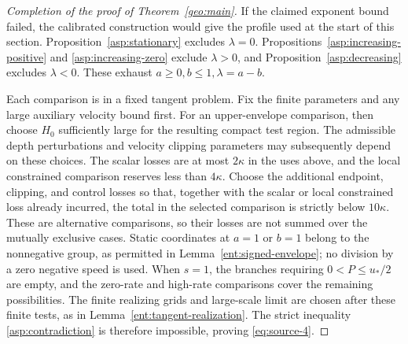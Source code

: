 \begin{proof}[Completion of the proof of Theorem~\ref{geo:main}]
If the claimed exponent bound failed, the calibrated construction would
give the profile used at the start of this section.
Proposition~\ref{asp:stationary} excludes \(\lambda=0\).
Propositions~\ref{asp:increasing-positive} and
\ref{asp:increasing-zero} exclude \(\lambda>0\), and
Proposition~\ref{asp:decreasing} excludes \(\lambda<0\).
These exhaust \(a\ge0,b\le1,\lambda=a-b\).

Each comparison is in a fixed tangent problem. Fix the finite parameters
and any large auxiliary velocity bound first. For an upper-envelope
comparison, then choose \(H_0\) sufficiently large for the resulting
compact test region. The admissible depth perturbations and velocity
clipping parameters may subsequently depend on these choices.
The scalar losses are at most \(2\kappa\) in the uses above,
and the local constrained comparison reserves less than \(4\kappa\).
Choose the additional endpoint, clipping, and control losses so that,
together with the scalar or local constrained loss already incurred,
the total in the selected comparison is strictly below \(10\kappa\).
These are alternative comparisons, so their losses are not summed
over the mutually exclusive cases. Static coordinates at \(a=1\)
or \(b=1\) belong to the nonnegative group, as permitted in
Lemma~\ref{ent:signed-envelope}; no division by a zero negative
speed is used. When \(s=1\), the branches requiring
\(0<P\le u_*/2\) are empty, and the zero-rate and high-rate
comparisons cover the remaining possibilities.
The finite realizing grids and large-scale limit are chosen after
these finite tests, as in Lemma~\ref{ent:tangent-realization}.
The strict inequality \eqref{asp:contradiction} is therefore
impossible, proving \eqref{eq:source-4}.
\end{proof}
